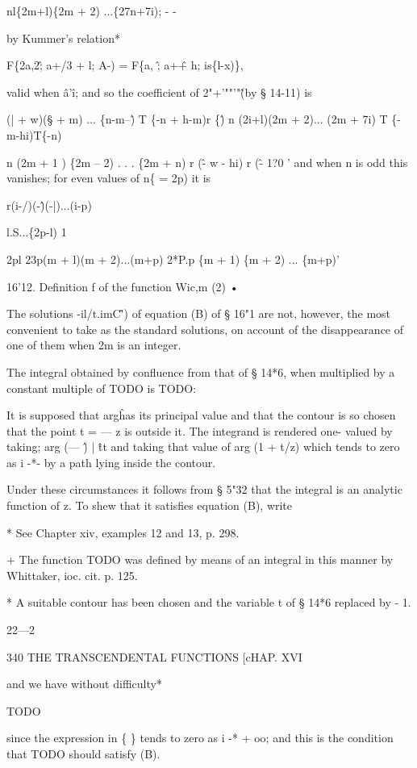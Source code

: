 nl\{2m+l)\{2m + 2) ...\{27n+7i); - -

by Kummer's relation*

F\{2a,2\^; a+/3 + l; A-) = F\{a, \^; a+\^ + h; is\{l-x)\},

valid when \^a'\^ i; and so the coefficient of 2"+'""'"\^ (by §
14-11) is

(| + w)(§ + m) ... \{n-m--\^ ) T \{-n + h-m)r \{\^ ) n (2i+l)(2m +
2)... (2m + 7i) T \{-m-hi)T\{-n)

n (2m + 1 ) \{2m -- 2) . . . \{2m + n) r (\^ - w - hi) r (\^ - 1?0 '
and when n is odd this vanishes; for even values of n\{ = 2p) it is

r(i-/)(-\^)(-|)...(i-p)

l.S...\{2p-l) 1

2pl 23p(m + l)(m + 2)...(m+p) 2*P.p \{m + 1) \{m + 2) ... \{m+p)'

16'12. Definition f of the function Wic,m (2) •

The solutions -il/t.imC\^') of equation (B) of § 16"1 are not,
however, the most convenient to take as the standard solutions, on
account of the disappearance of one of them when 2m is an integer.

The integral obtained by confluence from that of § 14*6, when
multiplied by a constant multiple of TODO is TODO:

It is supposed that arg\^ has its principal value and that the contour
is so chosen that the point t = — z is outside it. The integrand is
rendered one- valued by taking; arg (— \^) | \^ tt and taking that
value of arg (1 + t/z) which tends to zero as i -*- by a path lying
inside the contour.

Under these circumstances it follows from § 5"32 that the integral is
an analytic function of z. To shew that it satisfies equation (B),
write

* See Chapter xiv, examples 12 and 13, p. 298.

+ The function TODO was defined by means of an integral in this manner
by Whittaker, ioc. cit. p. 125.

* A suitable contour has been chosen and the variable t of § 14*6
replaced by - 1.

22—2

340 THE TRANSCENDENTAL FUNCTIONS [cHAP. XVI

and we have without difficulty*

TODO

since the expression in \{ \} tends to zero as i -* + oo; and this is
the condition that TODO should satisfy (B).

